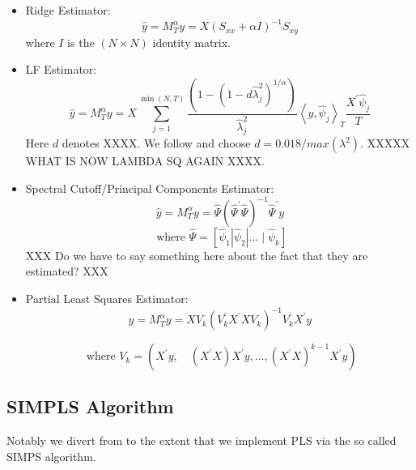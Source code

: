 \begin{itemize}
	\item Ridge Estimator: \\
	 \[\widehat{y} = M_{T}^{\alpha} y = X (S_{xx} + \alpha I)^{-1} S_{xy}\]
	 where $I$ is the $(N \times N)$ identity matrix.
	 
	\item LF Estimator: \\
\[\widehat{y} = M_{T}^{\alpha} y = X \sum_{j=1}^{\min (N, T)} \frac{\left(1-\left(1-d \widehat{\lambda}_{j}^{2}\right)^{1 / \alpha}\right)}{\widehat{\lambda}_{j}^{2}}\left\langle y, \hat{\psi}_{j}\right\rangle_{T} \frac{X^{\prime} \hat{\psi}_{j}}{T}\]
Here $d$ denotes XXXX. We follow \cite{carrasco2016sample} and choose $d = 0.018/max(\lambda^2)$. XXXXX WHAT IS NOW LAMBDA SQ AGAIN XXXX.

	\item Spectral Cutoff/Principal Components Estimator: \\
\[\widehat{y} = M_{T}^{\alpha} y = \widehat{\Psi} \left(\widehat{\Psi}^{\prime} \widehat{\Psi}\right)^{-1} \widehat{\Psi}^{\prime} y\]
\[\text{ where } \widehat{\Psi} = \left[\widehat{\psi}_{1}\left|\widehat{\psi}_{2}\right| \ldots \mid \widehat{\psi}_{k}\right]\]
XXX Do we have to say something here about the fact that they are estimated? XXX

	\item Partial Least Squares Estimator: \\

\[\widehat{y} = M_{T}^{\alpha} y = X V_{k}\left(V_{k}^{\prime} X^{\prime} X V_{k}\right)^{-1} V_{k}^{\prime} X^{\prime} y\]

\[\text{ where } V_{k}=\left(X^{\prime} y, \quad\left(X^{\prime} X\right) X^{\prime} y, \ldots,\left(X^{\prime} X\right)^{k-1} X^{\prime} y\right)\]

\end{itemize}










\subsection{SIMPLS Algorithm}

Notably we divert from \cite{carrasco2016sample} to the extent that we implement PLS via the so called SIMPS algorithm. 


